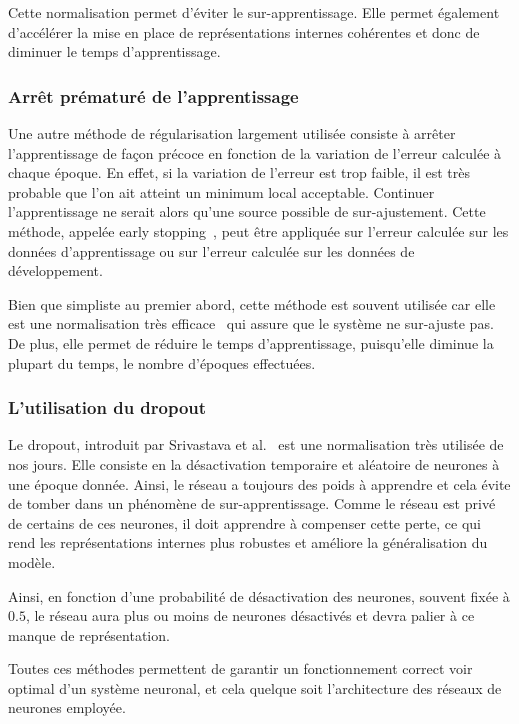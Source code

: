 Cette normalisation permet d'éviter le sur-apprentissage. Elle permet également d'accélérer la mise en place de représentations internes cohérentes et donc de diminuer le temps d'apprentissage.

\subsubsection{Arrêt prématuré de l'apprentissage}
Une autre méthode de régularisation largement utilisée consiste à arrêter l'apprentissage de façon précoce en fonction de la variation de l'erreur calculée à chaque époque. En effet, si la variation de l'erreur est trop faible, il est très probable que l'on ait atteint un minimum local acceptable. Continuer l'apprentissage ne serait alors qu'une source possible de sur-ajustement. Cette méthode, appelée early stopping~\cite{Prechelt1998}, peut être appliquée sur l'erreur calculée sur les données d'apprentissage ou sur l'erreur calculée sur les données de développement.

Bien que simpliste au premier abord, cette méthode est souvent utilisée car elle est une normalisation très efficace~\cite{Finnoff1993} qui assure que le système ne sur-ajuste pas. De plus, elle permet de réduire le temps d'apprentissage, puisqu'elle diminue la plupart du temps, le nombre d'époques effectuées.

\subsubsection{L'utilisation du dropout}
Le dropout, introduit par Srivastava et al.~\cite{Srivastava2014} est une normalisation très utilisée de nos jours. Elle consiste en la désactivation temporaire et aléatoire de neurones à une époque donnée. Ainsi, le réseau a toujours des poids à apprendre et cela évite de tomber dans un phénomène de sur-apprentissage. Comme le réseau est privé de certains de ces neurones, il doit apprendre à compenser cette perte, ce qui rend les représentations internes plus robustes et améliore la généralisation du modèle.

Ainsi, en fonction d'une probabilité de désactivation des neurones, souvent fixée à $0.5$, le réseau aura plus ou moins de neurones désactivés et devra palier à ce manque de représentation.

Toutes ces méthodes permettent de garantir un fonctionnement correct voir optimal d'un système neuronal, et cela quelque soit l'architecture des réseaux de neurones employée.

